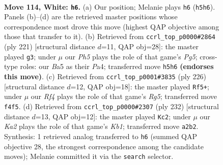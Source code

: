 \documentclass[11pt]{article}
\begin{document}
\clearpage

\begin{figure}[p]\centering
\begin{subfigure}{0.46\textwidth}\centering
\resizebox{\linewidth}{!}{%
\newchessgame
\chessboard[
  setfen={7k/7r/8/B6P/5R2/8/K4p2/8 w - - 6 114},
  showmover=false,
  pgfstyle=straightmove, color=movearrow, markmove={h5-h6}
]}
\caption{}
\end{subfigure}\hfill
\begin{subfigure}{0.46\textwidth}\centering
\resizebox{\linewidth}{!}{%
\newchessgame
\chessboard[
  setfen={1r6/8/8/1P4k1/p1KR2p1/P7/8/8 b - - 0 111},
  showmover=false,
  pgfstyle=straightmove, color=movearrow, markmove={g4-g3}
]}
\caption{}
\end{subfigure}
\\[4pt]
\begin{subfigure}{0.46\textwidth}\centering
\resizebox{\linewidth}{!}{%
\newchessgame
\chessboard[
  setfen={5r2/5P2/8/6R1/6p1/5k2/8/6K1 w - - 9 114},
  showmover=false,
  pgfstyle=straightmove, color=movearrow, markmove={g5-f5}
]}
\caption{}
\end{subfigure}\hfill
\begin{subfigure}{0.46\textwidth}\centering
\resizebox{\linewidth}{!}{%
\newchessgame
\chessboard[
  setfen={8/P2R4/rk6/8/8/2P5/8/1K6 w - - 25 117},
  showmover=false,
  pgfstyle=straightmove, color=movearrow, markmove={b1-c2}
]}
\caption{}
\end{subfigure}
\caption{\textbf{Move 114, White: \texttt{h6}.} (a) Our position; Melanie plays \texttt{h6} (\texttt{h5h6}). Panels (b)--(d) are the retrieved master positions whose correspondence most drove this move (highest QAP objective among those that transfer to it). (b) Retrieved from \texttt{ccrl\_top\_p0000\#2864} (ply 221) [structural distance $d$=11, QAP obj=28]: the master played \texttt{g3}; under $\mu$ our \emph{Ph5} plays the role of that game's \emph{Pg5}; cross-type roles: our \emph{B}a5 as their \emph{P}a4; transferred move \texttt{h5h6} \textbf{(endorses this move)}. (c) Retrieved from \texttt{ccrl\_top\_p0001\#3835} (ply 226) [structural distance $d$=12, QAP obj=18]: the master played \texttt{Rf5+}; under $\mu$ our \emph{Rf4} plays the role of that game's \emph{Rg5}; transferred move \texttt{f4f5}. (d) Retrieved from \texttt{ccrl\_top\_p0000\#2307} (ply 232) [structural distance $d$=13, QAP obj=12]: the master played \texttt{Kc2}; under $\mu$ our \emph{Ka2} plays the role of that game's \emph{Kb1}; transferred move \texttt{a2b2}. Synthesis: 1 retrieved analog transferred to \texttt{h6} (summed QAP objective 28, the strongest correspondence among the candidate moves); Melanie committed it via the \texttt{search} selector.}
\label{fig:thought-m226}
\end{figure}
\end{document}
